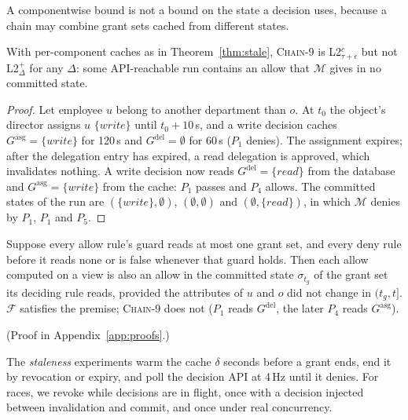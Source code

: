\documentclass[sigconf,review,anonymous]{acmart}
\newcommand{\chain}{\textsc{Chain-9}\xspace}
\newcommand{\Gasg}{G^{\mathrm{asg}}}
\newcommand{\Gdel}{G^{\mathrm{del}}}
\begin{document}
A componentwise bound is not a bound on the state a decision uses, because a chain may combine grant sets cached
from different states.

\begin{proposition}\label{prop:mixed}
With per-component caches as in Theorem~\ref{thm:stale}, \chain is L2$^c_{\tau+\epsilon}$ but not L2$^+_\Delta$ for
any $\Delta$: some API-reachable run contains an allow that $\mathcal{M}$ gives in no committed state.
\end{proposition}
\begin{proof}
Let employee $u$ belong to another department than $o$. At $t_0$ the object's director assigns $u$
$\{\mathit{write}\}$ until $t_0+10$\,s, and a write decision caches $\Gasg=\{\mathit{write}\}$ for 120\,s and
$\Gdel=\emptyset$ for 60\,s ($P_1$ denies). The assignment expires; after the delegation entry has expired, a read
delegation is approved, which invalidates nothing. A write decision now reads $\Gdel=\{\mathit{read}\}$ from the
database and $\Gasg=\{\mathit{write}\}$ from the cache: $P_1$ passes and $P_4$ allows. The committed states of the
run are $(\{\mathit{write}\},\emptyset)$, $(\emptyset,\emptyset)$ and $(\emptyset,\{\mathit{read}\})$, in which
$\mathcal{M}$ denies by $P_1$, $P_1$ and $P_5$.
\end{proof}

\begin{proposition}\label{prop:witness}
Suppose every allow rule's guard reads at most one grant set, and every deny rule before it reads none or is false
whenever that guard holds. Then each allow computed on a view is also an allow in the committed state
$\sigma_{t_g}$ of the grant set its deciding rule reads, provided the attributes of $u$ and $o$ did not change in
$(t_g,t]$. $\mathcal{F}$ satisfies the premise; \chain does not ($P_1$ reads $\Gdel$, the later $P_4$ reads
$\Gasg$).
\end{proposition}
(Proof in Appendix~\ref{app:proofs}.)

The \emph{staleness} experiments warm the cache $\delta$ seconds before a grant ends, end it by revocation or expiry,
and poll the decision API at 4\,Hz until it denies. For races, we revoke while decisions are in flight, once with a
decision injected between invalidation and commit, and once under real concurrency.
\end{document}
